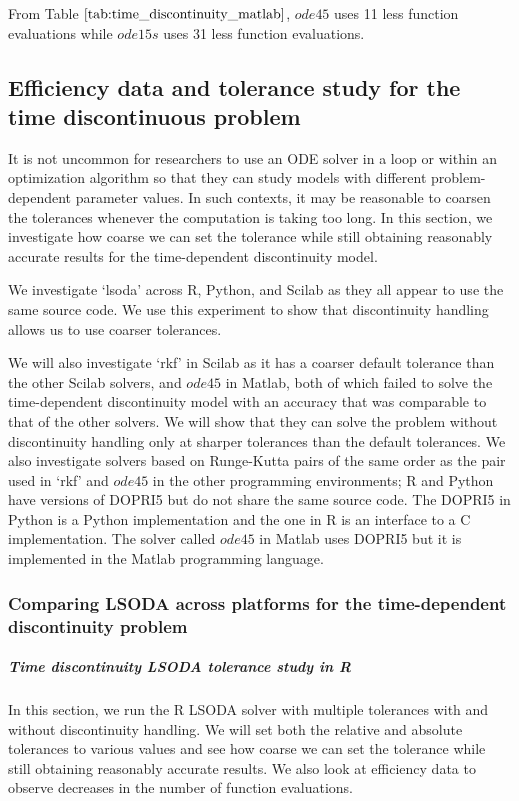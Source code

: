 From Table $\ref{tab:time_discontinuity_matlab}$, $ode45$ uses 11 less function evaluations while $ode15s$ uses 31 less function evaluations.

\subsection{Efficiency data and tolerance study for the time discontinuous problem}
\label{subsection:time_tolerance_study}
It is not uncommon for researchers to use an ODE solver in a loop or within an optimization algorithm so that they can study models with different problem-dependent parameter values. In such contexts, it may be reasonable to coarsen the tolerances whenever the computation is taking too long. In this section, we investigate how coarse we can set the tolerance while still obtaining reasonably accurate results for the time-dependent discontinuity model. 

We investigate `lsoda' across R, Python, and Scilab as they all appear to use the same source code. We use this experiment to show that discontinuity handling allows us to use coarser tolerances.

We will also investigate `rkf' in Scilab as it has a coarser default tolerance than the other Scilab solvers, and $ode45$ in Matlab, both of which failed to solve the time-dependent discontinuity model with an accuracy that was comparable to that of the other solvers. We will show that they can solve the problem without discontinuity handling only at sharper tolerances than the default tolerances. We also investigate solvers based on Runge-Kutta pairs of the same order as the pair used in `rkf' and $ode45$ in the other programming environments; R and Python have versions of DOPRI5 but do not share the same source code. The DOPRI5 in Python is a Python implementation and the one in R is an interface to a C implementation. The solver called $ode45$ in Matlab uses DOPRI5 but it is implemented in the Matlab programming language.

\subsubsection{Comparing LSODA across platforms for the time-dependent discontinuity problem}
\subparagraph{Time discontinuity LSODA tolerance study in R}
In this section, we run the R LSODA solver with multiple tolerances with and without discontinuity handling. We will set both the relative and absolute tolerances to various values and see how coarse we can set the tolerance while still obtaining reasonably accurate results. We also look at efficiency data to observe decreases in the number of function evaluations.

